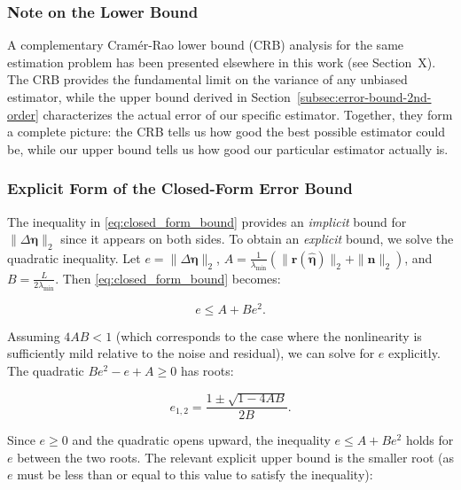 \documentclass[journal]{IEEEtran}
\begin{document}
\subsubsection{Note on the Lower Bound}
\label{subsubsec:lower-bound-note}

A complementary Cram\'{e}r-Rao lower bound (CRB) analysis for the same estimation problem has been presented elsewhere in this work (see Section~X). The CRB provides the fundamental limit on the variance of any unbiased estimator, while the upper bound derived in Section~\ref{subsec:error-bound-2nd-order} characterizes the actual error of our specific estimator. Together, they form a complete picture: the CRB tells us how good the best possible estimator could be, while our upper bound tells us how good our particular estimator actually is.

\subsubsection{Explicit Form of the Closed-Form Error Bound}
\label{subsubsec:explicit-bound}

The inequality in \eqref{eq:closed_form_bound} provides an \textit{implicit} bound for $\|\Delta\boldsymbol{\eta}\|_2$ since it appears on both sides. To obtain an \textit{explicit} bound, we solve the quadratic inequality. Let $e = \|\Delta\boldsymbol{\eta}\|_2$, $A = \frac{1}{\lambda_{\min}}(\|\mathbf{r}(\hat{\boldsymbol{\eta}})\|_2 + \|\mathbf{n}\|_2)$, and $B = \frac{L}{2\lambda_{\min}}$. Then \eqref{eq:closed_form_bound} becomes:

\begin{equation}
e \leq A + B e^2.
\label{eq:quadratic_inequality}
\end{equation}

Assuming $4AB < 1$ (which corresponds to the case where the nonlinearity is sufficiently mild relative to the noise and residual), we can solve for $e$ explicitly. The quadratic $Be^2 - e + A \geq 0$ has roots:

\begin{equation}
e_{1,2} = \frac{1 \pm \sqrt{1 - 4AB}}{2B}.
\label{eq:quadratic_roots}
\end{equation}

Since $e \geq 0$ and the quadratic opens upward, the inequality $e \leq A + B e^2$ holds for $e$ between the two roots. The relevant explicit upper bound is the smaller root (as $e$ must be less than or equal to this value to satisfy the inequality):
\end{document}
